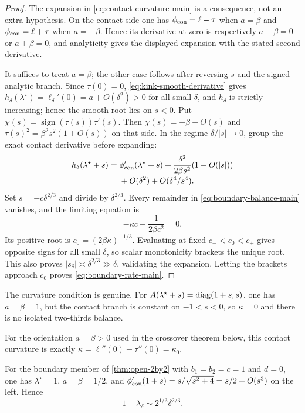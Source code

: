 \begin{proof}
The expansion in \eqref{eq:contact-curvature-main} is a consequence, not an
extra hypothesis.  On the contact side one has
\(\phi_{\rm con}=\ell-\tau\) when \(a=\beta\) and
\(\phi_{\rm con}=\ell+\tau\) when \(a=-\beta\).  Hence its derivative at
zero is respectively \(a-\beta=0\) or \(a+\beta=0\), and analyticity gives
the displayed expansion with the stated second derivative.

It suffices to treat \(a=\beta\); the other case follows after reversing
\(s\) and the signed analytic branch.  Since
\(\tau(0)=0\), \eqref{eq:kink-smooth-derivative} gives
\(h_\delta(\lambda^\star)=\ell_\delta'(0)=a+O(\delta^2)>0\) for all small
\(\delta\), and \(h_\delta\) is strictly increasing; hence the smooth root
lies on \(s<0\).
Put \(\chi(s)=\operatorname{sign}(\tau(s))\tau'(s)\).  Then
\(\chi(s)=-\beta+O(s)\) and
\(\tau(s)^2=\beta^2s^2(1+O(s))\) on that side.  In the regime
\(\delta/|s|\to0\), group the exact contact derivative before expanding:
\begin{align}
 h_\delta(\lambda^\star+s)
 ={}&\phi'_{\rm con}(\lambda^\star+s)
 +\frac{\delta^2}{2\beta s^2}(1+O(|s|)) \\[-0.2em]
 &+O(\delta^2)+O(\delta^4/s^4).
 \label{eq:boundary-balance-main}
\end{align}
Set \(s=-c\delta^{2/3}\) and divide by \(\delta^{2/3}\).  Every remainder
in \eqref{eq:boundary-balance-main} vanishes, and the limiting equation is
\[
 -\kappa c+\frac{1}{2\beta c^2}=0.
\]
Its positive root is \(c_0=(2\beta\kappa)^{-1/3}\).  Evaluating at fixed
\(c_-<c_0<c_+\) gives opposite signs for all small \(\delta\), so scalar
monotonicity brackets the unique root.  This also proves
\(|s_\delta|\asymp\delta^{2/3}\gg\delta\), validating the expansion.
Letting the brackets approach \(c_0\) proves \eqref{eq:boundary-rate-main}.
\end{proof}

The curvature condition is genuine.  For
\(A(\lambda^\star+s)=\operatorname{diag}(1+s,s)\), one has \(a=\beta=1\), but the contact
branch is constant on \(-1<s<0\), so \(\kappa=0\) and there is no isolated
two-thirds balance.

For the orientation \(a=\beta>0\) used in the crossover theorem below,
this contact curvature is exactly
\(\kappa=\ell''(0)-\tau''(0)=\kappa_0\).

For the boundary member of \cref{thm:open-2by2} with \(b_1=b_2=c=1\) and
\(d=0\), one has \(\lambda^\star=1\), \(a=\beta=1/2\), and
\(\phi'_{\rm con}(1+s)=s/\sqrt{s^2+4}=s/2+O(s^3)\) on the left.  Hence
\begin{equation}
 1-\lambda_\delta\sim2^{1/3}\delta^{2/3}.
 \label{eq:boundary-example-main}
\end{equation}


